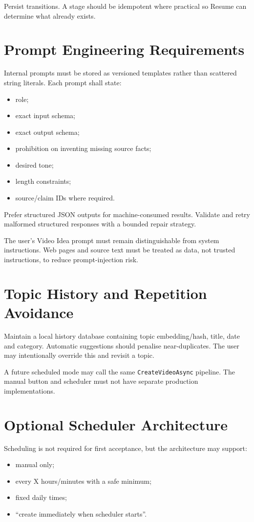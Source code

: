 \documentclass[10pt,journal,compsoc]{IEEEtran}
\begin{document}
Persist transitions. A stage should be idempotent where practical so Resume can determine what already exists.

\section{Prompt Engineering Requirements}

Internal prompts must be stored as versioned templates rather than scattered string literals. Each prompt shall state:
\begin{itemize}
    \item role;
    \item exact input schema;
    \item exact output schema;
    \item prohibition on inventing missing source facts;
    \item desired tone;
    \item length constraints;
    \item source/claim IDs where required.
\end{itemize}

Prefer structured JSON outputs for machine-consumed results. Validate and retry malformed structured responses with a bounded repair strategy.

The user's Video Idea prompt must remain distinguishable from system instructions. Web pages and source text must be treated as data, not trusted instructions, to reduce prompt-injection risk.

\section{Topic History and Repetition Avoidance}

Maintain a local history database containing topic embedding/hash, title, date and category. Automatic suggestions should penalise near-duplicates. The user may intentionally override this and revisit a topic.

A future scheduled mode may call the same \texttt{CreateVideoAsync} pipeline. The manual button and scheduler must not have separate production implementations.

\section{Optional Scheduler Architecture}

Scheduling is not required for first acceptance, but the architecture may support:
\begin{itemize}
    \item manual only;
    \item every X hours/minutes with a safe minimum;
    \item fixed daily times;
    \item ``create immediately when scheduler starts''.
\end{itemize}
\end{document}
